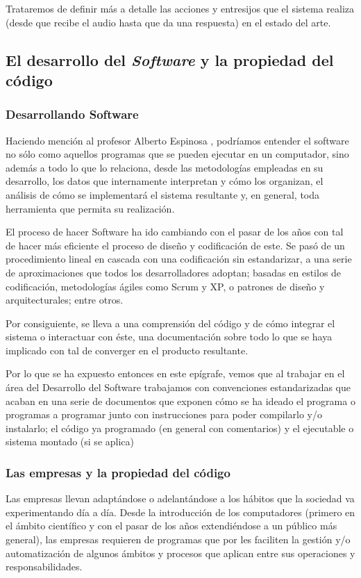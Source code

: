 
Trataremos de definir más a detalle las acciones y entresijos que el sistema realiza (desde que recibe el audio hasta que da una respuesta) en el estado del arte.

\subsection{El desarrollo del \textit{Software} y la propiedad del código }
\subsubsection{Desarrollando Software}
Haciendo mención al profesor Alberto Espinosa \cite{Prieto2006-ss}, podríamos entender el software no sólo como aquellos programas que se pueden ejecutar en un computador, sino además a todo lo que lo relaciona, desde las metodologías empleadas en su desarrollo, los datos que internamente interpretan y cómo los organizan, el análisis de cómo se implementará el sistema resultante y, en general, toda herramienta que permita su realización. 

El proceso de hacer Software ha ido cambiando con el pasar de los años con tal de hacer más eficiente el proceso de diseño y codificación de este. Se pasó de un procedimiento lineal en cascada con una codificación sin estandarizar, a una serie de aproximaciones que todos los desarrolladores adoptan; basadas en estilos de codificación, metodologías ágiles como Scrum y XP, o patrones de diseño y arquitecturales; entre otros. 

Por consiguiente, se lleva a una comprensión del código y de cómo integrar el sistema o interactuar con éste, una documentación sobre todo lo que se haya implicado con tal de converger en el producto resultante.

Por lo que se ha expuesto entonces en este epígrafe, vemos que al trabajar en el área del Desarrollo del Software trabajamos con convenciones estandarizadas que acaban en una serie de documentos que exponen cómo se ha ideado el programa o programas a programar junto con instrucciones para poder compilarlo y/o instalarlo; el código ya programado (en general con comentarios) y el ejecutable o sistema montado (si se aplica)

\subsubsection{Las empresas y la propiedad del código}
Las empresas llevan adaptándose o adelantándose a los hábitos que la sociedad va experimentando día a día.
Desde la introducción de los computadores (primero en el ámbito científico y con el pasar de los años extendiéndose a un público más general), las empresas requieren de programas que por les faciliten la gestión y/o automatización de algunos ámbitos y procesos que aplican entre sus operaciones y responsabilidades.


